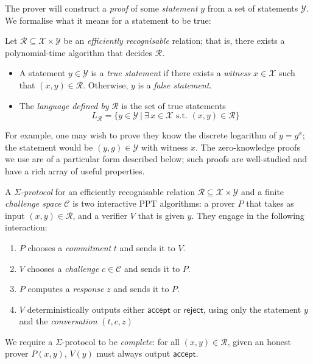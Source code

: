 \documentclass[12pt,a4paper]{article}
\theoremstyle{definition}
\begin{document}
The prover will construct a \textit{proof} of some \textit{statement} $y$ from a set of statements $\mathcal{Y}$. We formalise what it means for a statement to be true:
\begin{definition}
    Let $\mathcal{R}\subseteq\mathcal{X}\times\mathcal{Y}$ be an \textit{efficiently recognisable} relation; that is, there exists a polynomial-time algorithm that decides $\mathcal{R}$.
    \begin{itemize}
        \item A statement $y\in\mathcal{Y}$ is a \textit{true statement} if there exists a \textit{witness} $x\in\mathcal{X}$ such that $(x, y)\in\mathcal{R}$. Otherwise, $y$ is a \textit{false statement}.
        \item The \textit{language defined by} $\mathcal{R}$ is the set of true statements
        $$L_\mathcal{R}=\{y\in\mathcal{Y}\ |\ \exists\, x\in\mathcal{X}\text{ s.t. }(x,y)\in\mathcal{R}\}$$
    \end{itemize}
\end{definition}

For example, one may wish to prove they know the discrete logarithm of $y=g^x$; the statement would be $(y, g)\in\mathcal{Y}$ with witness $x$. The zero-knowledge proofs we use are of a particular form described below; such proofs are well-studied and have a rich array of useful properties.
\begin{definition}
    A $\mathit{\Sigma}$\textit{-protocol} for an efficiently recognisable relation $\mathcal{R}\subseteq\mathcal{X}\times\mathcal{Y}$ and a finite \textit{challenge space} $\mathcal{C}$ is two interactive PPT algorithms: a prover $P$ that takes as input $(x, y)\in\mathcal{R}$, and a verifier $V$ that is given $y$. They engage in the following interaction:
    \begin{enumerate}
        \item $P$ chooses a \textit{commitment} $t$ and sends it to $V$.
        \item $V$ chooses a \textit{challenge} $c\in\mathcal{C}$ and sends it to $P$.
        \item $P$ computes a \textit{response} $z$ and sends it to $P$.
        \item $V$ deterministically outputs either $\mathsf{accept}$ or $\mathsf{reject}$, using only the statement $y$ and the \textit{conversation} $(t, c, z)$
    \end{enumerate}
    We require a $\Sigma$-protocol to be \textit{complete}: for all $(x, y)\in\mathcal{R}$, given an honest prover $P(x, y)$, $V(y)$ must always output $\mathsf{accept}$.
\end{definition}
\end{document}
